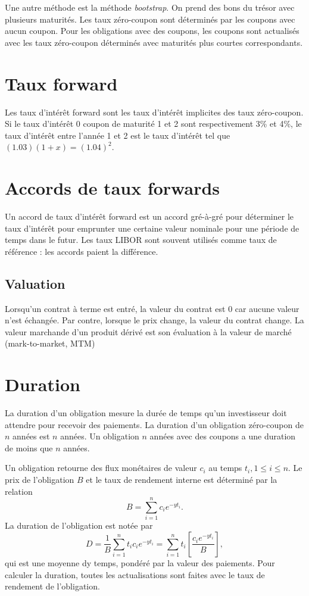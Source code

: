 Une autre méthode est la méthode \textit{bootstrap}. On prend des bons du trésor avec plusieurs maturités. Les taux zéro-coupon sont déterminés par les coupons avec aucun coupon. Pour les obligations avec des coupons, les coupons sont actualisés avec les taux zéro-coupon déterminés avec maturités plus courtes correspondants. 

\section{Taux forward}

Les taux d'intérêt forward sont les taux d'intérêt implicites des taux zéro-coupon. Si le taux d'intérêt 0 coupon de maturité 1 et 2 sont respectivement 3\% et 4\%, le taux d'intérêt entre l'année 1 et 2 est le taux d'intérêt tel que $(1.03)(1+x) = (1.04)^2$. 

\section{Accords de taux forwards}

Un accord de taux d'intérêt forward est un accord gré-à-gré pour déterminer le taux d'intérêt pour emprunter une certaine valeur nominale pour une période de temps dans le futur. Les taux LIBOR sont souvent utilisés comme taux de référence : les accords paient la différence. 

\subsection{Valuation}

Lorsqu'un contrat à terme est entré, la valeur du contrat est 0 car aucune valeur n'est échangée. Par contre, lorsque le prix change, la valeur du contrat change. La valeur marchande d'un produit dérivé est son évaluation à la valeur de marché (mark-to-market, MTM)

\section{Duration}

La duration d'un obligation mesure la durée de temps qu'un investisseur doit attendre pour recevoir des paiements. La duration d'un obligation zéro-coupon de $n$ années est $n$ années. Un obligation $n$ années avec des coupons a une duration de moins que $n$ années. 

Un obligation retourne des flux monétaires de valeur $c_i$ au temps $t_i, 1\leq i\leq n$. Le prix de l'obligation $B$ et le taux de rendement interne est déterminé par la relation
$$B = \sum_{i = 1}^{n}c_i e^{-yt_i}.$$
La duration de l'obligation est notée par 
$$D = \frac{1}{B} \sum_{i = 1}^{n}t_ic_ie^{-yt_i} = \sum_{i = 1}^{n} t_i \left[\frac{c_i e^{-yt_i}}{B}\right],$$
qui est une moyenne dy temps, pondéré par la valeur des paiements. Pour calculer la duration, toutes les actualisations sont faites avec le taux de rendement de l'obligation. 

